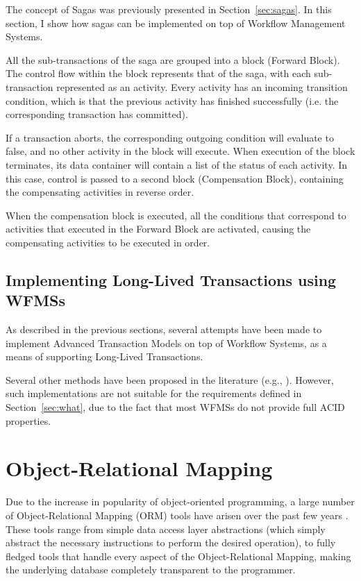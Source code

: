 The concept of Sagas was previously presented in
Section~\ref{sec:sagas}. In this section, I show how sagas can be
implemented on top of Workflow Management Systems.

All the sub-transactions of the saga are grouped into a block (Forward
Block). The control flow within the block represents that of the saga,
with each sub-transaction represented as an activity. Every activity
has an incoming transition condition, which is that the previous
activity has finished successfully (i.e. the corresponding transaction
has committed).

If a transaction aborts, the corresponding outgoing condition will
evaluate to false, and no other activity in the block will
execute. When execution of the block terminates, its data container
will contain a list of the status of each activity. In this case,
control is passed to a second block (Compensation Block), containing
the compensating activities in reverse order.

When the compensation block is executed, all the conditions that
correspond to activities that executed in the Forward Block are
activated, causing the compensating activities to be executed in
order.

\subsection{Implementing Long-Lived Transactions using WFMSs}

As described in the previous sections, several attempts have been made
to implement Advanced Transaction Models on top of Workflow Systems,
as a means of supporting Long-Lived Transactions.

Several other methods have been proposed in the literature (e.g.,
\cite{alonso1996advanced, 798492}). However, such implementations are
not suitable for the requirements defined in Section~\ref{sec:what},
due to the fact that most WFMSs do not provide full ACID properties.

\section{Object-Relational Mapping}
\label{sec:orm}

Due to the increase in popularity of object-oriented programming, a
large number of Object-Relational Mapping (ORM) tools have arisen over
the past few years \cite{orm}. These tools range from simple data
access layer abstractions (which simply abstract the necessary
instructions to perform the desired operation), to fully fledged
tools that handle every aspect of the Object-Relational Mapping,
making the underlying database completely transparent to the
programmer.

